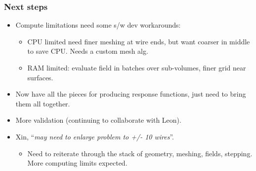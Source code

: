 \documentclass[xcolor=dvipsnames]{beamer}
\begin{document}
\begin{frame}
  \frametitle{Next steps}

  \begin{itemize}
  \item Compute limitations need some s/w dev workarounds: 
    \begin{itemize}\footnotesize
    \item CPU limited need finer meshing at wire ends, but want
      coarser in middle to save CPU.  Needs a custom mesh alg.
    \item RAM limited: evaluate field in batches over sub-volumes,
      finer grid near surfaces.  
    \end{itemize}
  \item Now have all the pieces for producing response functions, just
    need to bring them all together.
  \item More validation (continuing to collaborate with Leon).
  \item Xin, ``\textit{may need to enlarge problem to +/- 10 wires}''.
    \begin{itemize}\footnotesize
    \item Need to reiterate through the stack of geometry, meshing,
      fields, stepping.  More computing limits expected.
    \end{itemize}
  \end{itemize}

\end{frame}
\end{document}
